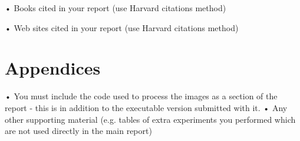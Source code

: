 \documentclass[12pt]{article}
\begin{document}
• Books cited in your report (use Harvard citations method)

• Web sites cited in your report (use Harvard citations method)

\section{Appendices}
• You must include the code used to process the images as a section of the report - this is in addition to the executable version submitted with it.
• Any other supporting material (e.g. tables of extra experiments you performed which are not used directly in the main report)





\end{document}
